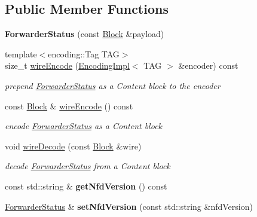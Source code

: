 \subsection*{Public Member Functions}
\begin{DoxyCompactItemize}
\item 
{\bfseries Forwarder\+Status} (const \hyperlink{classndn_1_1Block}{Block} \&payload)\hypertarget{classndn_1_1nfd_1_1ForwarderStatus_acecd6a667778a1103a0958509e7ee517}{}\label{classndn_1_1nfd_1_1ForwarderStatus_acecd6a667778a1103a0958509e7ee517}

\item 
{\footnotesize template$<$encoding\+::\+Tag T\+AG$>$ }\\size\+\_\+t \hyperlink{classndn_1_1nfd_1_1ForwarderStatus_a158408b8bc2d76348e07a322a3b8c480}{wire\+Encode} (\hyperlink{classndn_1_1encoding_1_1EncodingImpl}{Encoding\+Impl}$<$ T\+AG $>$ \&encoder) const
\begin{DoxyCompactList}\small\item\em prepend \hyperlink{classndn_1_1nfd_1_1ForwarderStatus}{Forwarder\+Status} as a Content block to the encoder \end{DoxyCompactList}\item 
const \hyperlink{classndn_1_1Block}{Block} \& \hyperlink{classndn_1_1nfd_1_1ForwarderStatus_a86b1a85f4ac0e6fd1ea927eefe1e9bdb}{wire\+Encode} () const
\begin{DoxyCompactList}\small\item\em encode \hyperlink{classndn_1_1nfd_1_1ForwarderStatus}{Forwarder\+Status} as a Content block \end{DoxyCompactList}\item 
void \hyperlink{classndn_1_1nfd_1_1ForwarderStatus_abfc1230b9ffd67d88c09ead2e64aa68f}{wire\+Decode} (const \hyperlink{classndn_1_1Block}{Block} \&wire)
\begin{DoxyCompactList}\small\item\em decode \hyperlink{classndn_1_1nfd_1_1ForwarderStatus}{Forwarder\+Status} from a Content block \end{DoxyCompactList}\item 
const std\+::string \& {\bfseries get\+Nfd\+Version} () const\hypertarget{classndn_1_1nfd_1_1ForwarderStatus_a0b8fd7119eaddfce9e51dfae6241ea05}{}\label{classndn_1_1nfd_1_1ForwarderStatus_a0b8fd7119eaddfce9e51dfae6241ea05}

\item 
\hyperlink{classndn_1_1nfd_1_1ForwarderStatus}{Forwarder\+Status} \& {\bfseries set\+Nfd\+Version} (const std\+::string \&nfd\+Version)\hypertarget{classndn_1_1nfd_1_1ForwarderStatus_a6eb55490fa15fbdda42ae55950d6e49f}{}\label{classndn_1_1nfd_1_1ForwarderStatus_a6eb55490fa15fbdda42ae55950d6e49f}


\end{DoxyCompactItemize}
